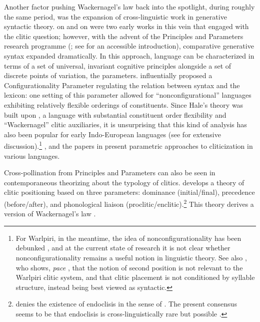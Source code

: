 \documentclass[output=paper]{../langscibook}
\begin{document}
Another factor pushing Wackernagel's law back into the spotlight, during roughly the same period, was the expansion of cross-linguistic work in generative syntactic theory. \citet{Hale1973} on  and \citet{Kayne1975} on  were two early works in this vein that engaged with the clitic question; however, with the advent of the Principles and Parameters research programme (\citealp{Chomsky1981,Chomsky1982,Borer1981,Rizzi1982}; see \citealp{Roberts1997} for an accessible introduction), comparative generative syntax expanded dramatically. In this approach, language can be characterized in terms of a set of universal, invariant cognitive principles alongside a set of discrete points of variation, the parameters. \citet{Hale1983} influentially proposed a Configurationality Parameter regulating the relation between syntax and the lexicon: one setting of this parameter allowed for ``nonconfigurational'' languages exhibiting relatively flexible orderings of constituents. Since Hale's theory was built upon , a language with substantial constituent order flexibility and ``Wackernagel'' clitic auxiliaries, it is unsurprising that this kind of analysis has also been popular for early Indo-European languages (see \citealp{Ledgeway2012} for extensive discussion).\footnote{For Warlpiri, in the meantime, the idea of nonconfigurationality has been debunked \citep{Legate2002}, and at the current state of research it is not clear whether nonconfigurationality remains a useful notion in linguistic theory. See also \citet{Legate2008}, who shows, \textit{pace} \citeauthor{Hale1973}, that the notion of second position is not relevant to the Warlpiri clitic system, and that clitic placement is not conditioned by syllable structure, instead being best viewed as syntactic.} \citet{Borer1981}, \citet{Rivero1986} and the papers in \citet{Borer1986} present parametric approaches to cliticization in various languages.

Cross-pollination from Principles and Parameters can also be seen in contemporaneous theorizing about the typology of clitics. \citet{Klavans1985} develops a theory of clitic positioning based on three parameters: dominance (initial/final), precedence (before/after), and phonological liaison (proclitic/enclitic).\footnote{\citet{Klavans1979,Klavans1985} denies the existence of endoclisis in the sense of \citet{Zwicky1977}. The present consensus seems to be that endoclisis is cross-linguistically rare but possible \citep{Harris2002,Smith2013}.} This theory derives a version of Wackernagel's law \citep[117]{Klavans1985}.
\end{document}
